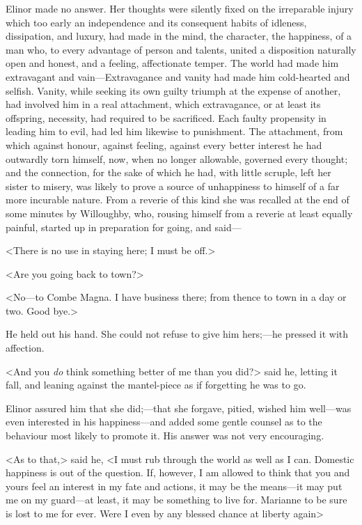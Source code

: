 Elinor made no answer. Her thoughts were silently fixed on the irreparable injury which too early an independence and its consequent habits of idleness, dissipation, and luxury, had made in the mind, the character, the happiness, of a man who, to every advantage of person and talents, united a disposition naturally open and honest, and a feeling, affectionate temper. The world had made him extravagant and vain—Extravagance and vanity had made him cold-hearted and selfish. Vanity, while seeking its own guilty triumph at the expense of another, had involved him in a real attachment, which extravagance, or at least its offspring, necessity, had required to be sacrificed. Each faulty propensity in leading him to evil, had led him likewise to punishment. The attachment, from which against honour, against feeling, against every better interest he had outwardly torn himself, now, when no longer allowable, governed every thought; and the connection, for the sake of which he had, with little scruple, left her sister to misery, was likely to prove a source of unhappiness to himself of a far more incurable nature. From a reverie of this kind she was recalled at the end of some minutes by Willoughby, who, rousing himself from a reverie at least equally painful, started up in preparation for going, and said—

<There is no use in staying here; I must be off.>

<Are you going back to town?>

<No—to Combe Magna. I have business there; from thence to town in a day or two. Good bye.>

He held out his hand. She could not refuse to give him hers;—he pressed it with affection.

<And you \textit{do} think something better of me than you did?> said he, letting it fall, and leaning against the mantel-piece as if forgetting he was to go.

Elinor assured him that she did;—that she forgave, pitied, wished him well—was even interested in his happiness—and added some gentle counsel as to the behaviour most likely to promote it. His answer was not very encouraging.

<As to that,> said he, <I must rub through the world as well as I can. Domestic happiness is out of the question. If, however, I am allowed to think that you and yours feel an interest in my fate and actions, it may be the means—it may put me on my guard—at least, it may be something to live for. Marianne to be sure is lost to me for ever. Were I even by any blessed chance at liberty again\longdash>

